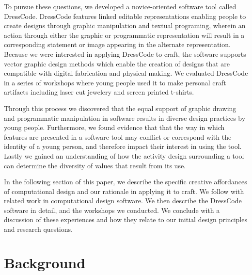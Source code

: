 \documentclass{sigchi}
\begin{document}
To pursue these questions, we developed a novice-oriented software tool called DressCode. DressCode features linked editable representations enabling people to create designs through graphic manipulation and textual programing, wherein an action through either the graphic or programmatic representation will result in a corresponding statement or image appearing in the alternate representation. %
Because we were interested in applying DressCode to craft, the software supports vector graphic design methods which enable the creation of designs that are compatible with digital fabrication and physical making. We evaluated DressCode in a series of workshops where young people used it to make personal craft artifacts including laser cut jewelery and screen printed t-shirts. 

Through this process we discovered that the equal support of graphic drawing and programmatic manipulation in software results in diverse design practices by young people. Furthermore, we found evidence that that the way in which features are presented in a software tool may conflict or correspond with the identity of a young person, and therefore impact their interest in using the tool. Lastly we gained an understanding of how the activity design surrounding a tool can determine the diversity of values that result from its use.%

In the following section of this paper, we describe the specific creative affordances of computational design and our rationale in applying it to craft. We follow with related work in computational design software. We then describe the DressCode software in detail, and the workshops we conducted. We conclude with a discussion of these experiences and how they relate to our initial design principles and research questions. 

\section{Background}
\end{document}
